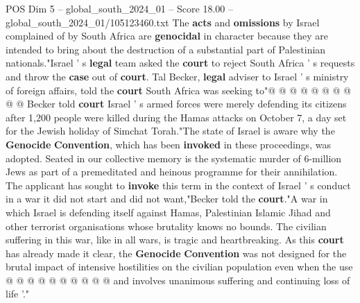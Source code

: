 \begin{textsample}{POS Dim 5 – global\_south\_2024\_01 – Score 18.00 – global\_south\_2024\_01/105123460.txt}
The \textbf{acts} and \textbf{omissions} by Israel complained of by South Africa are \textbf{genocidal} in character because they are intended to bring about the destruction of a substantial part of Palestinian nationals."Israel ' s \textbf{legal} team asked the \textbf{court} to reject South Africa ' s requests and throw the \textbf{case} out of \textbf{court}.
Tal Becker, \textbf{legal} adviser to Israel ' s ministry of foreign affairs, told the \textbf{court} South Africa was seeking to"@ @ @ @ @ @ @ @ @ @ Becker told \textbf{court} Israel ' s armed forces were merely defending its citizens after 1,200 people were killed during the Hamas attacks on October 7, a day set for the Jewish holiday of Simchat Torah."The state of Israel is aware why the \textbf{Genocide} \textbf{Convention}, which has been \textbf{invoked} in these proceedings, was adopted.
Seated in our collective memory is the systematic murder of 6-million Jews as part of a premeditated and heinous programme for their annihilation.
The applicant has sought to \textbf{invoke} this term in the context of Israel ' s conduct in a war it did not start and did not want,"Becker told the \textbf{court}."A war in which Israel is defending itself against Hamas, Palestinian Islamic Jihad and other terrorist organisations whose brutality knows no bounds.
The civilian suffering in this war, like in all wars, is tragic and heartbreaking.
As this \textbf{court} has already made it clear, the \textbf{Genocide} \textbf{Convention} was not designed for the brutal impact of intensive hostilities on the civilian population even when the use @ @ @ @ @ @ @ @ @ @ and involves unanimous suffering and continuing loss of life '."

\end{textsample}
